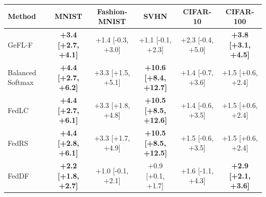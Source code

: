 \begin{tabular}{lccccc}
\toprule
Method & MNIST & Fashion-MNIST & SVHN & CIFAR-10 & CIFAR-100\\
\midrule
GeFL-F & \textbf{+3.4 [+2.7, +4.1]} & +1.4 [-0.3, +3.0] & +1.1 [-0.1, +2.3] & +2.3 [-0.4, +5.0] & \textbf{+3.8 [+3.1, +4.5]}\\
Balanced Softmax & \textbf{+4.4 [+2.7, +6.2]} & +3.3 [+1.5, +5.1] & \textbf{+10.6 [+8.4, +12.7]} & +1.4 [-0.7, +3.6] & +1.5 [+0.6, +2.4]\\
FedLC & \textbf{+4.4 [+2.7, +6.1]} & +3.3 [+1.8, +4.8] & \textbf{+10.5 [+8.5, +12.6]} & +1.4 [-0.6, +3.5] & +1.5 [+0.6, +2.4]\\
FedRS & \textbf{+4.4 [+2.8, +6.1]} & +3.3 [+1.7, +4.9] & \textbf{+10.5 [+8.5, +12.5]} & +1.5 [-0.6, +3.5] & +1.5 [+0.6, +2.4]\\
FedDF & \textbf{+2.2 [+1.8, +2.7]} & +1.0 [-0.1, +2.1] & +0.9 [+0.1, +1.7] & +1.6 [-1.1, +4.3] & \textbf{+2.9 [+2.1, +3.6]}\\
\bottomrule
\end{tabular}
